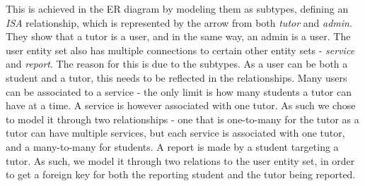 This is achieved in the ER diagram by modeling them as subtypes, defining an \textit{ISA} relationship, which is represented by the arrow from both \textit{tutor} and \textit{admin}.
They show that a tutor is a user, and in the same way, an admin is a user.
The user entity set also has multiple connections to certain other entity sets - \textit{service} and \textit{report}.
The reason for this is due to the subtypes. 
As a user can be both a student and a tutor, this needs to be reflected in the relationships.
Many users can be associated to a service - the only limit is how many students a tutor can have at a time.
A service is however associated with one tutor.
As such we chose to model it through two relationships - one that is one-to-many for the tutor as a tutor can have multiple services, but each service is associated with one tutor, and a many-to-many for students.
A report is made by a student targeting a tutor. 
As such, we model it through two relations to the user entity set, in order to get a foreign key for both the reporting student and the tutor being reported.


